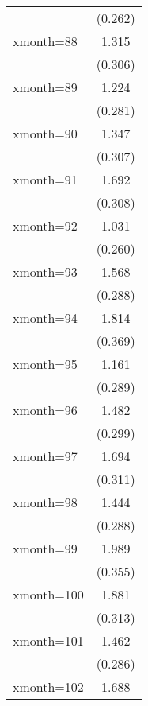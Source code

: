 \begin{table}[htbp]
\begin{tabular}{l*{1}{c}}
                    &     (0.262)         \\
[1em]
xmonth=88           &       1.315\sym{***}\\
                    &     (0.306)         \\
[1em]
xmonth=89           &       1.224\sym{***}\\
                    &     (0.281)         \\
[1em]
xmonth=90           &       1.347\sym{***}\\
                    &     (0.307)         \\
[1em]
xmonth=91           &       1.692\sym{***}\\
                    &     (0.308)         \\
[1em]
xmonth=92           &       1.031\sym{***}\\
                    &     (0.260)         \\
[1em]
xmonth=93           &       1.568\sym{***}\\
                    &     (0.288)         \\
[1em]
xmonth=94           &       1.814\sym{***}\\
                    &     (0.369)         \\
[1em]
xmonth=95           &       1.161\sym{***}\\
                    &     (0.289)         \\
[1em]
xmonth=96           &       1.482\sym{***}\\
                    &     (0.299)         \\
[1em]
xmonth=97           &       1.694\sym{***}\\
                    &     (0.311)         \\
[1em]
xmonth=98           &       1.444\sym{***}\\
                    &     (0.288)         \\
[1em]
xmonth=99           &       1.989\sym{***}\\
                    &     (0.355)         \\
[1em]
xmonth=100          &       1.881\sym{***}\\
                    &     (0.313)         \\
[1em]
xmonth=101          &       1.462\sym{***}\\
                    &     (0.286)         \\
[1em]
xmonth=102          &       1.688\sym{***}\\

\end{tabular}
\end{table}
